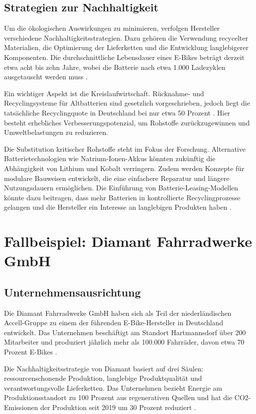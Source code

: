 \documentclass[12pt,a4paper]{article}
\begin{document}
\subsection{Strategien zur Nachhaltigkeit}

Um die ökologischen Auswirkungen zu minimieren, verfolgen Hersteller verschiedene Nachhaltigkeitsstrategien. Dazu gehören die Verwendung recycelter Materialien, die Optimierung der Lieferketten und die Entwicklung langlebigerer Komponenten. Die durchschnittliche Lebensdauer eines E-Bikes beträgt derzeit etwa acht bis zehn Jahre, wobei die Batterie nach etwa 1.000 Ladezyklen ausgetauscht werden muss \cite{adfc2024}.

Ein wichtiger Aspekt ist die Kreislaufwirtschaft. Rücknahme- und Recyclingsysteme für Altbatterien sind gesetzlich vorgeschrieben, jedoch liegt die tatsächliche Recyclingquote in Deutschland bei nur etwa 50 Prozent \cite{grs2023}. Hier besteht erhebliches Verbesserungspotenzial, um Rohstoffe zurückzugewinnen und Umweltbelastungen zu reduzieren.

Die Substitution kritischer Rohstoffe steht im Fokus der Forschung. Alternative Batterietechnologien wie Natrium-Ionen-Akkus könnten zukünftig die Abhängigkeit von Lithium und Kobalt verringern. Zudem werden Konzepte für modulare Bauweisen entwickelt, die eine einfachere Reparatur und längere Nutzungsdauern ermöglichen. Die Einführung von Batterie-Leasing-Modellen könnte dazu beitragen, dass mehr Batterien in kontrollierte Recyclingprozesse gelangen und die Hersteller ein Interesse an langlebigen Produkten haben \cite{ifeu2022}.

\clearpage
\section{Fallbeispiel: Diamant Fahrradwerke GmbH}

\subsection{Unternehmensausrichtung}

Die Diamant Fahrradwerke GmbH haben sich als Teil der niederländischen Accell-Gruppe zu einem der führenden E-Bike-Hersteller in Deutschland entwickelt. Das Unternehmen beschäftigt am Standort Hartmannsdorf über 200 Mitarbeiter und produziert jährlich mehr als 100.000 Fahrräder, davon etwa 70 Prozent E-Bikes \cite{diamant2024}.

Die Nachhaltigkeitsstrategie von Diamant basiert auf drei Säulen: ressourcenschonende Produktion, langlebige Produktqualität und verantwortungsvolle Lieferketten. Das Unternehmen bezieht Energie am Produktionsstandort zu 100 Prozent aus regenerativen Quellen und hat die CO2-Emissionen der Produktion seit 2019 um 30 Prozent reduziert \cite{accell2024}.
\end{document}
